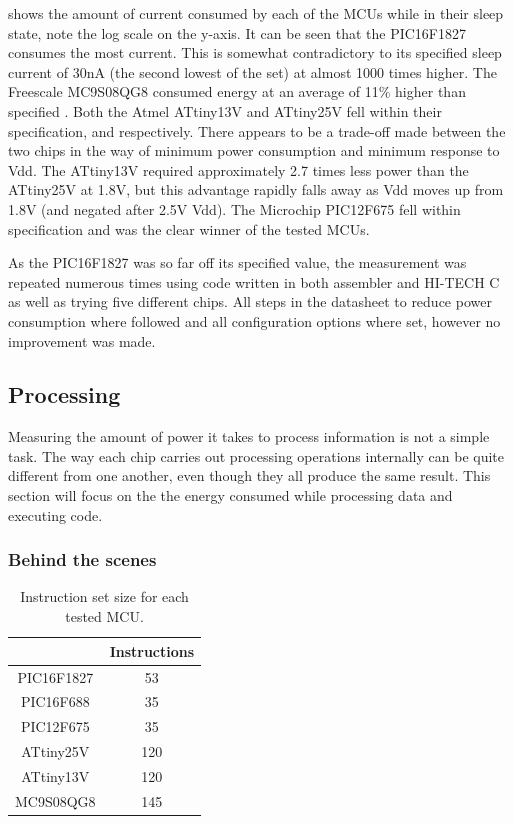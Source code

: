  shows the amount of current consumed
by each of the MCUs while in their sleep state, note the log scale
on the y-axis. It can be seen that the PIC16F1827 consumes the most
current. This is somewhat contradictory to its specified sleep current
of 30nA \cite{PIC16F1827} (the second lowest of the set) at almost
1000 times higher. The Freescale MC9S08QG8 consumed energy at an average
of 11\% higher than specified \cite{MC9S08QG8}. Both the Atmel ATtiny13V
and ATtiny25V fell within their specification, \cite{AtmelATtiny13}
and \cite{AtmelATtiny25} respectively. There appears to be a trade-off
made between the two chips in the way of minimum power consumption
and minimum response to Vdd. The ATtiny13V required approximately
2.7 times less power than the ATtiny25V at 1.8V, but this advantage
rapidly falls away as Vdd moves up from 1.8V (and negated after 2.5V
Vdd). The Microchip PIC12F675 fell within specification\cite{PIC12F675}
and was the clear winner of the tested MCUs.

As the PIC16F1827 was so far off its specified value, the measurement
was repeated numerous times using code written in both assembler and
HI-TECH C as well as trying five different chips. All steps in the
datasheet to reduce power consumption where followed and all configuration
options where set, however no improvement was made.


\subsection{Processing}

Measuring the amount of power it takes to process information is not
a simple task. The way each chip carries out processing operations
internally can be quite different from one another, even though they
all produce the same result. This section will focus on the the energy
consumed while processing data and executing code.


\subsubsection*{Behind the scenes \label{sub:Behind-the-scenes}}

\begin{table}
\begin{centering}
\begin{tabular}{|c|c|}
\cline{2-2}
\multicolumn{1}{c|}{} & Instructions\tabularnewline
\hline
PIC16F1827 & 53\tabularnewline
\hline
PIC16F688 & 35\tabularnewline
\hline
PIC12F675 & 35\tabularnewline
\hline
ATtiny25V & 120\tabularnewline
\hline
ATtiny13V & 120\tabularnewline
\hline
MC9S08QG8 & 145\tabularnewline
\hline
\end{tabular}
\par\end{centering}

\centering{}\protect\caption{\label{tab:Number-of-instructions}Instruction set size for each tested
MCU.}
\end{table}


